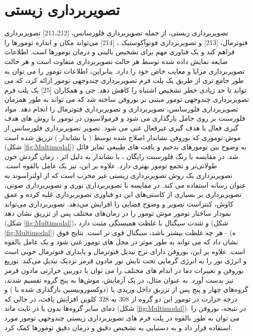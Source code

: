 \section{تصویربرداری زیستی}
تصویربرداری زیستی، از جمله تصویربرداری فلورسانس، \cite{gaoVivoCancerTargeting2004, medintzQuantumDotBioconjugates2005}[211،212] تصویربرداری فتوترمال، \cite{huangCancerCellImaging2006}[213] و تصویربرداری فوتوآکوستیک ، \cite{beardBiomedicalPhotoacousticImaging2011}[214] می‌تواند مکان و اندازه تومورها را فراهم کند و یک فناوری مهم برای تشخیص بالینی و درمان تومورها است. اطلاعات ضایعه نمایش داده شده توسط هر حالت تصویربرداری متفاوت است و هر حالت تصویربرداری مزایا و معایب خاص خود را دارد. بنابراین، اطلاعات تومور را می توان به طور جامع تری از طریق یک پلت فرم تصویربرداری چندوجهی تومور ارائه کرد، که می تواند تا حد زیادی خطر تشخیص اشتباه را کاهش دهد. جی و همکاران \cite{jiNovelTopDownSynthesis2018}[25] یک پلت فرم تصویربرداری چندوجهی تومور مبتنی بر بوروفن ساخته شد که می تواند به طور همزمان تصویربرداری فلورسانس، تصویربرداری  و تصویربرداری فتوترمال را انجام دهد. مواد فلورسنت بر روی حامل بارگذاری می شود و فرمولاسیون در تومور با روش های هدف گیری فعال یا هدف گیری غیرفعال غنی می شود. تصویر تصویربرداری فلورسانس از موش توموری که بوروفن نشاندار  اصلاح شده توسط  (  با نشاندار ) تزریق شده است (شکل \ref{fig:Multimodal}) به وضوح بین تومورهای بدخیم و بافت های طبیعی تمایز قائل شد. در مقایسه با رنگ فلورسنت رایگان ،  با نشاندار  به دلیل اثر ، زمان گردش خون طولانی‌تر و تجمع تومور بهتری دارد. علاوه بر این،  نیز یک عامل بالقوه  است. تصویربرداری  یک روش تصویربرداری زیستی غیر مخرب است که از اولتراسوند به عنوان رسانه استفاده می کند. در مقایسه با تصویربرداری نوری و تصویربرداری صوتی، تصویربرداری  بر بسیاری از کاستی‌های این دو فناوری تصویربرداری غلبه کرده و عمق کاوش، کنتراست تصویر و وضوح فضایی را افزایش می‌دهد. تصویربرداری  می‌تواند نمودار ساختار تومور موش تومور را در زمان‌های مختلف پس از تزریق  نشان دهد (شکل \ref{fig:Multimodal})، و شدت سیگنال  با غلظت  همبستگی مثبت دارد (شکل \ref{fig:Multimodal}) ه) - هر چه غلظت  بیشتر باشد، سیگنال قوی تر است. نتایج فوق نشان داد که  می تواند به طور موثر در محل های تومور غنی شود و یک عامل بالقوه  است. علاوه بر این، بوروفن دارای نرخ تبدیل فتوترمال و پایداری فتوترمال خوبی است و انرژی نور را به انرژی گرمایی تحت تابش نور مادون قرمز نزدیک  تبدیل می‌کند. توزیع بوروفن و تغییرات دما در اندام های مختلف را می توان با دوربین حرارتی مادون قرمز نیز بدست آورد. به عنوان مثال، در یک آزمایش، موش‌ها به پنج گروه تقسیم شدند، گروه‌های چهار و پنج پس از تزریق داخل وریدی  یا  (دوکسوروبیسین بارگذاری شده با ) و درجه حرارت در تومور این دو گروه از 308 به 328 کلوین افزایش یافت، در حالی که دمای سایر گروه‌ها بدون  یا  در  ثابت ماند (شکل \ref{fig:Multimodal}). در نتیجه، بوروفن را می توان به طور بالقوه در پلت فرم های تصویربرداری زیستی چندوجهی تومور مورد استفاده قرار داد و به دستیابی به تشخیص دقیق و درمان دقیق تومورها کمک کرد.
